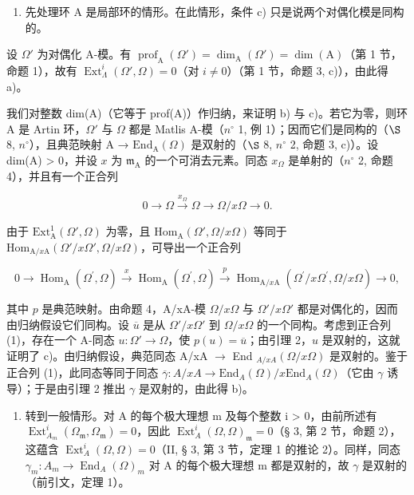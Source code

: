 \begin{enumerate}
\def\labelenumi{\Alph{enumi})}
\tightlist
\item
  先处理环 A 是局部环的情形。在此情形，条件 c) 只是说两个对偶化模是同构的。
\end{enumerate}

设 \(\Omega'\) 为对偶化 A-模。有 \(\operatorname{prof}_{\mathrm{A}}(\Omega') = \dim_{\mathrm{A}}(\Omega') = \dim(\mathrm{A})\)（第 1 节，命题 1），故有 \(\operatorname{Ext}_{\Lambda}^{i}(\Omega', \Omega) = 0\)（对 \(i \neq 0\)）（第 1 节，命题 3, c)），由此得 a)。

我们对整数 dim(A)（它等于 prof(A)）作归纳，来证明 b) 与 c)。若它为零，则环 A 是 Artin 环，\(\Omega'\) 与 \(\Omega\) 都是 Matlis A-模（\(n^{\circ}\) 1, 例 1）；因而它们是同构的（\(\S\) 8, \(n^{\circ}\)），且典范映射 A → \(\mathrm{End}_{\mathrm{A}}(\Omega)\) 是双射的（\(\S\) 8, \(n^{\circ}\) 2, 命题 3, c)）。设 dim(A) \textgreater{} 0，并设 \(x\) 为 \(\mathfrak{m}_{\mathrm{A}}\) 的一个可消去元素。同态 \(x_{\Omega}\) 是单射的（\(n^{\circ}\) 2, 命题 4），并且有一个正合列

\[
0 \rightarrow \Omega \xrightarrow {x _ {\Omega}} \Omega \longrightarrow \Omega / x \Omega \rightarrow 0.
\]

由于 \(\mathrm{Ext}_{\mathrm{A}}^{1}(\Omega',\Omega)\) 为零，且 \(\mathrm{Hom}_{\mathrm{A}}(\Omega',\Omega /x\Omega)\) 等同于 \(\mathrm{Hom}_{\mathrm{A} / x\mathrm{A}}(\Omega'/x\Omega',\Omega/x\Omega)\)，可导出一个正合列

\[
0 \rightarrow \operatorname{Hom} _ {\mathrm{A}} \left(\Omega^ {\prime}, \Omega\right) \xrightarrow {x} \operatorname{Hom} _ {\mathrm{A}} \left(\Omega^ {\prime}, \Omega\right) \xrightarrow {p} \operatorname{Hom} _ {\mathrm{A} / x \mathrm{A}} \left(\Omega^ {\prime} / x \Omega^ {\prime}, \Omega / x \Omega\right)\rightarrow 0,\tag{1}
\]

其中 \(p\) 是典范映射。由命题 4，A/xA-模 \(\Omega/x\Omega\) 与 \(\Omega'/x\Omega'\) 都是对偶化的，因而由归纳假设它们同构。设 \(\overline{u}\) 是从 \(\Omega'/x\Omega'\) 到 \(\Omega/x\Omega\) 的一个同构。考虑到正合列 (1)，存在一个 A-同态 \(u: \Omega' \to \Omega\)，使 \(p(u) = \overline{u}\)；由引理 2，\(u\) 是双射的，这就证明了 c)。由归纳假设，典范同态 A/xA \(\longrightarrow\) End \(_{A/xA}(\Omega/x\Omega)\) 是双射的。鉴于正合列 (1)，此同态等同于同态 \(\overline{\gamma}: A/xA \longrightarrow \text{End}_A(\Omega)/x \text{End}_A(\Omega)\)（它由 \(\gamma\) 诱导）；于是由引理 2 推出 \(\gamma\) 是双射的，由此得 b)。

\begin{enumerate}
\def\labelenumi{\Alph{enumi})}
\setcounter{enumi}{1}
\tightlist
\item
  转到一般情形。对 A 的每个极大理想 m 及每个整数 i \textgreater{} 0，由前所述有 \(\operatorname{Ext}_{A_{m}}^{i}(\Omega_{\mathfrak{m}}, \Omega_{\mathfrak{m}}) = 0\)，因此 \(\operatorname{Ext}_{A}^{i}(\Omega, \Omega)_{\mathfrak{m}} = 0\)（§ 3, 第 2 节，命题 2），这蕴含 \(\operatorname{Ext}_{A}^{i}(\Omega, \Omega) = 0\)（II, § 3, 第 3 节，定理 1 的推论 2）。同样，同态 \(\gamma_{m}: A_{m} \to \operatorname{End}_{A}(\Omega)_{m}\) 对 A 的每个极大理想 m 都是双射的，故 \(\gamma\) 是双射的（前引文，定理 1）。
\end{enumerate}

